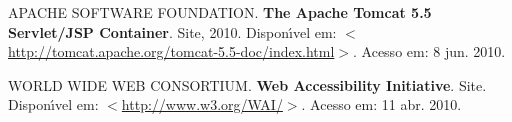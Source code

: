 \providecommand{\abntreprintinfo}[1]{%
 \citeonline{#1}}
\begin{thebibliography}{}
\renewcommand{\abntrefinfo}[3]{}
\providecommand{\abntbstabout}[1]{}
\abntbstabout{1.50 }

\abntrefinfo{APACHE SOFTWARE FOUNDATION}{APACHE SOFTWARE FOUNDATION}{2010}
{APACHE SOFTWARE FOUNDATION. \textbf{The Apache Tomcat 5.5 Servlet/JSP
  Container}.
Site, 2010. Dispon{\'\i}vel em:
  $<$\url{http://tomcat.apache.org/tomcat-5.5-doc/index.html}$>$. Acesso em: 8
  jun. 2010.}

\abntrefinfo{WORLD WIDE WEB CONSORTIUM}{WORLD WIDE WEB CONSORTIUM}{}
{WORLD WIDE WEB CONSORTIUM. \textbf{Web Accessibility Initiative}.
Site. Dispon{\'\i}vel em: $<$\url{http://www.w3.org/WAI/}$>$. Acesso em: 11
  abr. 2010.}

\end{thebibliography}
